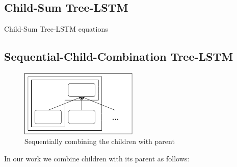 \documentclass[10pt, a4paper]{article}
\begin{document}
\subsection{Child-Sum Tree-LSTM}
Child-Sum Tree-LSTM equations \cite{tai2015improved}

	
\subsection{Sequential-Child-Combination Tree-LSTM}

\begin{figure}[h]
	 \begin{center}
    	\includegraphics[width=0.5\textwidth]{sequentialchild}
		\caption{Sequentially combining the children with parent}
	 \end{center}
\end{figure}
	In our work we combine children with its parent as follows:
\end{document}
